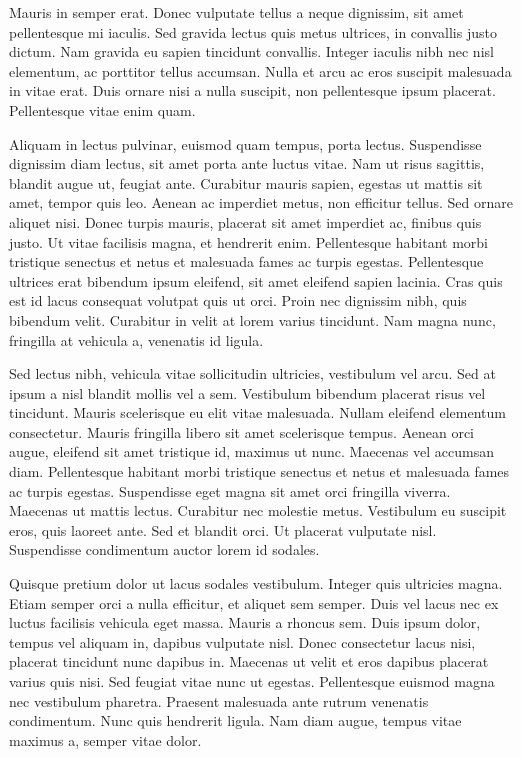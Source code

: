 \documentclass[a4paper,15pt]{article}
\begin{document}
Mauris in semper erat. Donec vulputate tellus a neque dignissim, sit amet pellentesque mi iaculis. Sed gravida lectus quis metus ultrices, in convallis justo dictum. Nam gravida eu sapien tincidunt convallis. Integer iaculis nibh nec nisl elementum, ac porttitor tellus accumsan. Nulla et arcu ac eros suscipit malesuada in vitae erat. Duis ornare nisi a nulla suscipit, non pellentesque ipsum placerat. Pellentesque vitae enim quam.

Aliquam in lectus pulvinar, euismod quam tempus, porta lectus. Suspendisse dignissim diam lectus, sit amet porta ante luctus vitae. Nam ut risus sagittis, blandit augue ut, feugiat ante. Curabitur mauris sapien, egestas ut mattis sit amet, tempor quis leo. Aenean ac imperdiet metus, non efficitur tellus. Sed ornare aliquet nisi. Donec turpis mauris, placerat sit amet imperdiet ac, finibus quis justo. Ut vitae facilisis magna, et hendrerit enim. Pellentesque habitant morbi tristique senectus et netus et malesuada fames ac turpis egestas. Pellentesque ultrices erat bibendum ipsum eleifend, sit amet eleifend sapien lacinia. Cras quis est id lacus consequat volutpat quis ut orci. Proin nec dignissim nibh, quis bibendum velit. Curabitur in velit at lorem varius tincidunt. Nam magna nunc, fringilla at vehicula a, venenatis id ligula.

Sed lectus nibh, vehicula vitae sollicitudin ultricies, vestibulum vel arcu. Sed at ipsum a nisl blandit mollis vel a sem. Vestibulum bibendum placerat risus vel tincidunt. Mauris scelerisque eu elit vitae malesuada. Nullam eleifend elementum consectetur. Mauris fringilla libero sit amet scelerisque tempus. Aenean orci augue, eleifend sit amet tristique id, maximus ut nunc. Maecenas vel accumsan diam. Pellentesque habitant morbi tristique senectus et netus et malesuada fames ac turpis egestas. Suspendisse eget magna sit amet orci fringilla viverra. Maecenas ut mattis lectus. Curabitur nec molestie metus. Vestibulum eu suscipit eros, quis laoreet ante. Sed et blandit orci. Ut placerat vulputate nisl. Suspendisse condimentum auctor lorem id sodales.

Quisque pretium dolor ut lacus sodales vestibulum. Integer quis ultricies magna. Etiam semper orci a nulla efficitur, et aliquet sem semper. Duis vel lacus nec ex luctus facilisis vehicula eget massa. Mauris a rhoncus sem. Duis ipsum dolor, tempus vel aliquam in, dapibus vulputate nisl. Donec consectetur lacus nisi, placerat tincidunt nunc dapibus in. Maecenas ut velit et eros dapibus placerat varius quis nisi. Sed feugiat vitae nunc ut egestas. Pellentesque euismod magna nec vestibulum pharetra. Praesent malesuada ante rutrum venenatis condimentum. Nunc quis hendrerit ligula. Nam diam augue, tempus vitae maximus a, semper vitae dolor.
\end{document}
